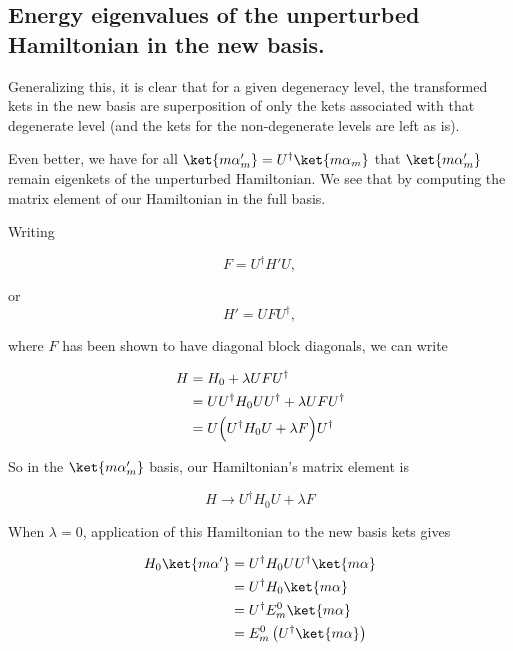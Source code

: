 \subsection{Energy eigenvalues of the unperturbed Hamiltonian in the new basis.}

Generalizing this, it is clear that for a given degeneracy level, the transformed kets in the new basis are superposition of only the kets associated with that degenerate level (and the kets for the non-degenerate levels are left as is).

Even better, we have for all $\ket{m \alpha_m'} = U^\dagger \ket{m \alpha_m}$ that $\ket{m \alpha_m'}$ remain eigenkets of the unperturbed Hamiltonian.  We see that by computing the matrix element of our Hamiltonian in the full basis.

Writing

\begin{equation}\label{eqn:pertubationDegeneracy:410}
F = U^\dagger H' U,
\end{equation}

or
\begin{equation}\label{eqn:pertubationDegeneracy:430}
H' = U F U^\dagger,
\end{equation}

where $F$ has been shown to have diagonal block diagonals, we can write

\begin{align*}\label{eqn:pertubationDegeneracy:450}
H 
&= H_0 + \lambda U F U^\dagger \\
&= U U^\dagger H_0 U U^\dagger + \lambda U F U^\dagger \\
&= U \Bigl( U^\dagger H_0 U + \lambda F \Bigr) U^\dagger 
\end{align*}

So in the $\ket{m \alpha_m'}$ basis, our Hamiltonian's matrix element is

\begin{equation}\label{eqn:pertubationDegeneracy:470}
H \rightarrow U^\dagger H_0 U + \lambda F 
\end{equation}

When $\lambda = 0$, application of this Hamiltonian to the new basis kets gives

\begin{align*}
H_0 
\ket{m \alpha'} 
&=
U^\dagger H_0 U 
U^\dagger
\ket{m \alpha}  \\
&=
U^\dagger H_0
\ket{m \alpha}  \\
&=
U^\dagger E_m^0
\ket{m \alpha}  \\
&=
E_m^0
\left(
U^\dagger 
\ket{m \alpha}\right)  \\
\end{align*}

